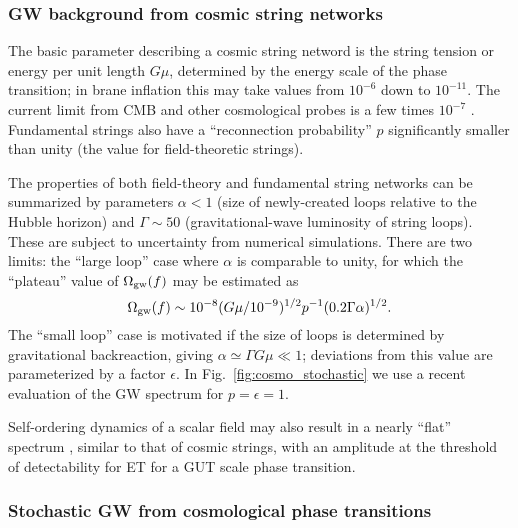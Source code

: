 \subsubsection{GW background from cosmic string networks}
\label{box:cosmicstring}

The basic parameter describing a cosmic string netword is the string tension or energy per unit length $G\mu$, determined by the energy scale of the phase transition; in brane inflation this may take values from $10^{-6}$ down to $10^{-11}$. The current limit from CMB and other cosmological probes is a few times $10^{-7}$ \cite{Pogosian:2003mz,Battye:2006pk,Bevis:2007gh}. Fundamental strings also have a ``reconnection probability'' $p$ significantly smaller than unity (the value for field-theoretic strings). 

The properties of both field-theory and fundamental string networks can be summarized by parameters $\alpha <1$ (size of newly-created loops relative to the Hubble horizon) and $\Gamma \sim 50$ (gravitational-wave luminosity of string loops). These are subject to uncertainty from
numerical simulations.
There are two limits: the ``large loop'' case where $\alpha$ is comparable to unity, for which the ``plateau'' value of $\Omega_{\rm gw}(f)$ may be estimated \cite{Hogan:2006we} as
\begin{equation}
	\Omega_{\rm gw}(f) \sim 10^{-8}(G\mu/10^{-9})^{1/2} p^{-1}(0.2\Gamma\alpha)^{1/2}.
\end{equation}
The ``small loop'' case is motivated if the size of loops is determined by gravitational backreaction, giving $\alpha\simeq \Gamma G\mu \ll 1$;
deviations from this value \cite{Damour:2004kw} are parameterized by a factor $\epsilon$. In Fig.~\ref{fig:cosmo_stochastic} we use a recent evaluation \cite{Siemens:2006yp} of the GW spectrum for $p=\epsilon=1$. %

Self-ordering dynamics of a scalar field may also result in a nearly ``flat'' spectrum \cite{Fenu:2009qf}, similar to that of cosmic strings, with an amplitude at the threshold of detectability for ET for a GUT scale phase transition.

\subsubsection{Stochastic GW from cosmological phase transitions}
\label{box:phasetrans}

